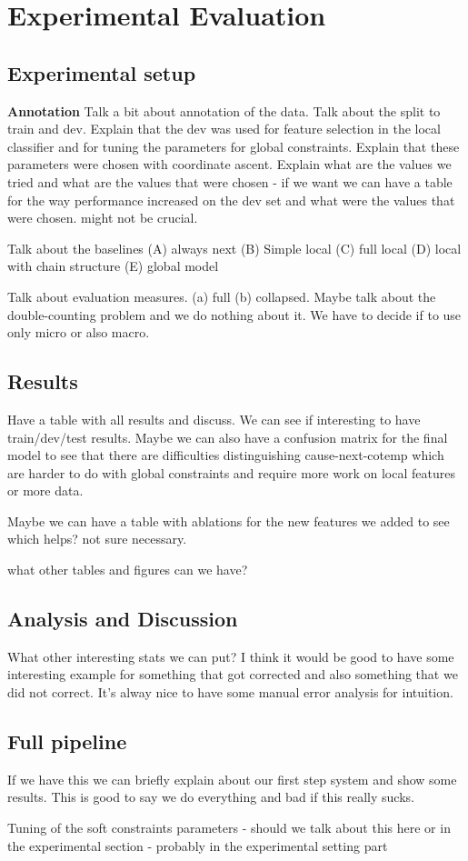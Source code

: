 \section{Experimental Evaluation}

\subsection{Experimental setup}

\textbf{Annotation} Talk a bit about annotation of the data. Talk about the split to train and dev. Explain that the dev was used for feature selection in the local classifier and for tuning the parameters for global constraints. Explain that these parameters were chosen with coordinate ascent. Explain what are the values we tried and what are the values that were chosen - if we want we can have a table for the way performance increased on the dev set and what were the values that were chosen. might not be crucial.

Talk about the baselines (A) always next (B) Simple local (C) full local (D) local with chain structure (E) global model

Talk about evaluation measures. (a) full (b) collapsed. Maybe talk about the double-counting problem and we do nothing about it. We have to decide if to use only micro or also macro. 

\subsection{Results}

Have a table with all results and discuss. We can see if interesting to have train/dev/test results. Maybe we can also have a confusion matrix for the final model to see that there are difficulties distinguishing cause-next-cotemp which are harder to do with global constraints and require more work on local features or more data.

Maybe we can have a table with ablations for the new features we added to see which helps? not sure necessary.

what other tables and figures can we have?

\subsection{Analysis and Discussion}

What other interesting stats we can put? I think it would be good to have some interesting example for something that got corrected and also something that we did not correct. It's alway nice to have some manual error analysis for intuition.

\subsection{Full pipeline}

If we have this we can briefly explain about our first step system and show some results. This is good to say we do everything and bad if this really sucks.




Tuning of the soft constraints parameters - should we talk about this here or in the experimental section - probably in the experimental setting part
